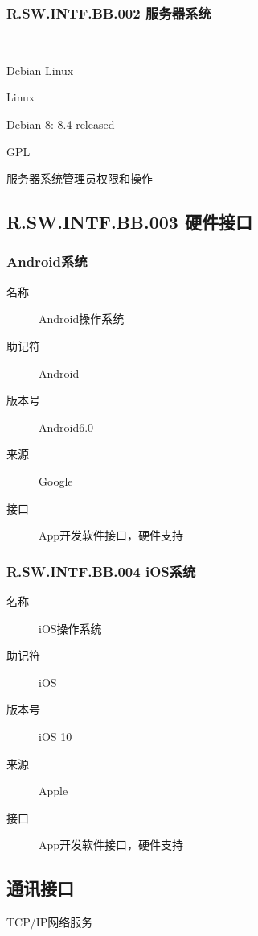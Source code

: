     \subsubsection{R.SW.INTF.BB.002 服务器系统}
	   \begin{center}\begin{description}
      \item[名称] Debian Linux
      \item[助记符] Linux
      \item[版本号] Debian 8: 8.4 released
	     \item[来源] GPL
	      \item[接口] 服务器系统管理员权限和操作
	   \end{description}\end{center}

     \subsection{R.SW.INTF.BB.003 硬件接口}
     \subsubsection{Android系统}
	    \begin{center}\begin{description}
      \item[名称] Android操作系统
      \item[助记符] Android
      \item[版本号]Android6.0
	\item[来源] Google
	\item[接口] App开发软件接口，硬件支持
	\end{description}\end{center}

    \subsubsection{R.SW.INTF.BB.004 iOS系统}
	\begin{center}\begin{description}
      \item[名称] iOS操作系统
      \item[助记符] iOS
      \item[版本号] iOS 10
	\item[来源] Apple
	\item[接口] App开发软件接口，硬件支持
	\end{description}\end{center}

  \subsection{通讯接口}
	TCP/IP网络服务
